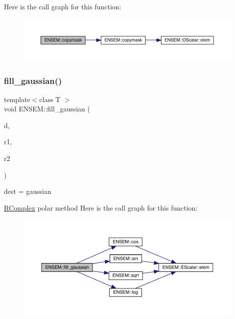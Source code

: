 Here is the call graph for this function\+:\nopagebreak
\begin{figure}[H]
\begin{center}
\leavevmode
\includegraphics[width=350pt]{da/dc7/group__rcomplex_ga8228a6185ea266e1e7d4c221c76bd5f1_cgraph}
\end{center}
\end{figure}
\mbox{\label{group__rcomplex_gaa47b1150a227265f108216052a5029d8}} 
\subsubsection{\texorpdfstring{fill\_gaussian()}{fill\_gaussian()}}
{\footnotesize\ttfamily template$<$class T $>$ \\
void E\+N\+S\+E\+M\+::fill\+\_\+gaussian (\begin{DoxyParamCaption}\item[{\mbox{\hyperlink{classENSEM_1_1RComplex}{R\+Complex}}$<$ T $>$ \&}]{d,  }\item[{\mbox{\hyperlink{classENSEM_1_1RComplex}{R\+Complex}}$<$ T $>$ \&}]{r1,  }\item[{\mbox{\hyperlink{classENSEM_1_1RComplex}{R\+Complex}}$<$ T $>$ \&}]{r2 }\end{DoxyParamCaption})\hspace{0.3cm}{\ttfamily [inline]}}



dest = gaussian 

\mbox{\hyperlink{classENSEM_1_1RComplex}{R\+Complex}} polar method Here is the call graph for this function\+:\nopagebreak
\begin{figure}[H]
\begin{center}
\leavevmode
\includegraphics[width=350pt]{da/dc7/group__rcomplex_gaa47b1150a227265f108216052a5029d8_cgraph}
\end{center}
\end{figure}
\mbox{\label{group__rcomplex_ga376839cc33ca36a705bdb22f74bb22d4}} 
